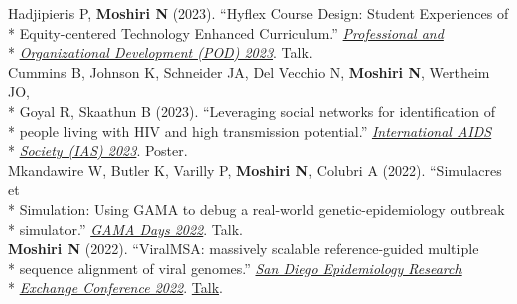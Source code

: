 \documentclass[margin,line]{res}
\begin{document}
\begin{resume}
\hspace*{4mm} Hadjipieris P, \textbf{Moshiri N} (2023). ``Hyflex Course Design: Student Experiences of\\*
\hspace*{9.5mm} Equity-centered Technology Enhanced Curriculum.'' \href{https://podnetwork.org/48th-annual-conference/}{\textit{Professional and}}\\*\vspace{2mm}
\hspace*{8mm} \href{https://podnetwork.org/48th-annual-conference/}{\textit{Organizational Development (POD) 2023}}. Talk.\\
\hspace*{4mm} Cummins B, Johnson K, Schneider JA, Del Vecchio N, \textbf{Moshiri N}, Wertheim JO,\\*
\hspace*{9.5mm} Goyal R, Skaathun B (2023). ``Leveraging social networks for identification of\\*
\hspace*{9.5mm} people living with HIV and high transmission potential.'' \href{https://www.iasociety.org/conferences/ias2023}{\textit{International AIDS}}\\*\vspace{2mm}
\hspace*{9.5mm}\href{https://www.iasociety.org/conferences/ias2023}{\textit{Society (IAS) 2023}}. Poster.\\
\hspace*{4mm} Mkandawire W, Butler K, Varilly P, \textbf{Moshiri N}, Colubri A (2022). ``Simulacres et\\*
\hspace*{9.5mm} Simulation: Using GAMA to debug a real-world genetic-epidemiology outbreak\\*\vspace{2mm}
\hspace*{8mm} simulator.'' \href{https://gama-platform.org/Gama-Days-2022/}{\textit{GAMA Days 2022}}. Talk.\\
\hspace*{4mm} \textbf{Moshiri N} (2022). ``ViralMSA: massively scalable reference-guided multiple\\*
\hspace*{9.5mm} sequence alignment of viral genomes.'' \href{https://publichealth.sdsu.edu/epiexchange}{\textit{San Diego Epidemiology Research}}\\*\vspace{2mm}
\hspace*{8mm} \href{https://publichealth.sdsu.edu/epiexchange}{\textit{Exchange Conference 2022}}. \href{https://docs.google.com/document/d/e/2PACX-1vTufgGn-94tzBuzs1MXideQPxZApXW0EvSHIyfKQX8xdXPvwVo1H3C4WbWSgmp67BbERnjzc_tkYqdm/pub}{Talk}.\\

\end{resume}
\end{document}
